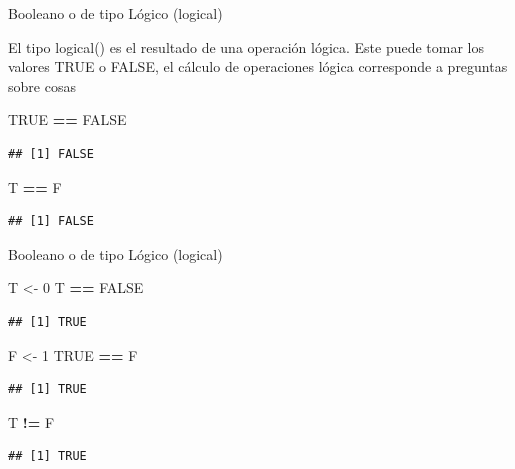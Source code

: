 \documentclass[ignorenonframetext,]{beamer}
\newenvironment{Shaded}{\begin{snugshade}}{\end{snugshade}}
\newcommand{\DecValTok}[1]{\textcolor[rgb]{0.00,0.00,0.81}{#1}}
\newcommand{\StringTok}[1]{\textcolor[rgb]{0.31,0.60,0.02}{#1}}
\newcommand{\OtherTok}[1]{\textcolor[rgb]{0.56,0.35,0.01}{#1}}
\newcommand{\OperatorTok}[1]{\textcolor[rgb]{0.81,0.36,0.00}{\textbf{#1}}}
\newcommand{\NormalTok}[1]{#1}
\begin{document}
\begin{frame}[fragile]{Booleano o de tipo Lógico (logical)}

El tipo logical() es el resultado de una operación lógica. Este puede
tomar los valores TRUE o FALSE, el cálculo de operaciones lógica
corresponde a preguntas sobre cosas

\begin{Shaded}
\begin{Highlighting}[]
\OtherTok{TRUE} \OperatorTok{==}\StringTok{ }\OtherTok{FALSE}
\end{Highlighting}
\end{Shaded}

\begin{verbatim}
## [1] FALSE
\end{verbatim}

\begin{Shaded}
\begin{Highlighting}[]
\NormalTok{T }\OperatorTok{==}\StringTok{ }\NormalTok{F}
\end{Highlighting}
\end{Shaded}

\begin{verbatim}
## [1] FALSE
\end{verbatim}

\end{frame}

\begin{frame}[fragile]{Booleano o de tipo Lógico (logical)}

\begin{Shaded}
\begin{Highlighting}[]
\NormalTok{T <-}\StringTok{ }\DecValTok{0}
\NormalTok{T }\OperatorTok{==}\StringTok{ }\OtherTok{FALSE}
\end{Highlighting}
\end{Shaded}

\begin{verbatim}
## [1] TRUE
\end{verbatim}

\begin{Shaded}
\begin{Highlighting}[]
\NormalTok{F <-}\StringTok{ }\DecValTok{1}
\OtherTok{TRUE} \OperatorTok{==}\StringTok{ }\NormalTok{F}
\end{Highlighting}
\end{Shaded}

\begin{verbatim}
## [1] TRUE
\end{verbatim}

\begin{Shaded}
\begin{Highlighting}[]
\NormalTok{T }\OperatorTok{!=}\StringTok{ }\NormalTok{F}
\end{Highlighting}
\end{Shaded}

\begin{verbatim}
## [1] TRUE
\end{verbatim}

\end{frame}
\end{document}
